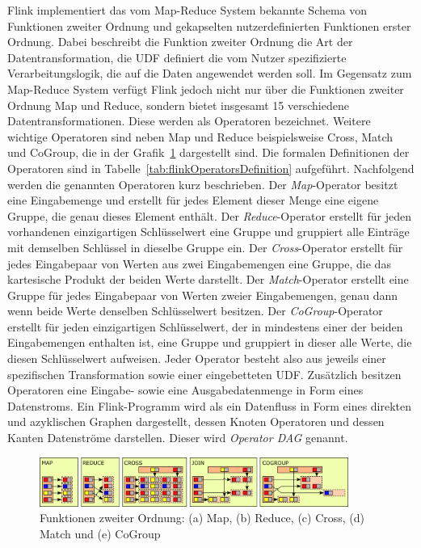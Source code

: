 Flink implementiert das vom Map-Reduce System bekannte Schema von Funktionen zweiter Ordnung und gekapselten nutzerdefinierten Funktionen erster Ordnung. Dabei beschreibt die Funktion zweiter Ordnung die Art der Datentransformation, die UDF definiert die vom Nutzer spezifizierte Verarbeitungslogik, die auf die Daten angewendet werden soll. Im Gegensatz zum Map-Reduce System verfügt Flink jedoch nicht nur über die Funktionen zweiter Ordnung Map und Reduce, sondern bietet insgesamt 15 verschiedene Datentransformationen. Diese werden als Operatoren bezeichnet. Weitere wichtige Operatoren sind neben Map und Reduce beispielsweise Cross, Match und CoGroup, die in der Grafik~\ref{graphicFlinkOperators} dargestellt sind. Die formalen Definitionen der Operatoren sind in Tabelle~\ref{tab:flinkOperatorsDefinition} aufgeführt. Nachfolgend werden die genannten Operatoren kurz beschrieben. Der \textit{Map}-Operator besitzt eine Eingabemenge und erstellt für jedes Element dieser Menge eine eigene Gruppe, die genau dieses Element enthält. Der \textit{Reduce}-Operator erstellt für jeden vorhandenen einzigartigen Schlüsselwert eine Gruppe und gruppiert alle Einträge mit demselben Schlüssel in dieselbe Gruppe ein. Der \textit{Cross}-Operator erstellt für jedes Eingabepaar von Werten aus zwei Eingabemengen eine Gruppe, die das kartesische Produkt der beiden Werte darstellt. Der \textit{Match}-Operator erstellt eine Gruppe für jedes Eingabepaar von Werten zweier Eingabemengen, genau dann wenn beide Werte denselben Schlüsselwert besitzen. Der \textit{CoGroup}-Operator erstellt für jeden einzigartigen Schlüsselwert, der in mindestens einer der beiden Eingabemengen enthalten ist, eine Gruppe und gruppiert in dieser alle Werte, die diesen Schlüsselwert aufweisen.
Jeder Operator besteht also aus jeweils einer spezifischen Transformation sowie einer eingebetteten UDF. Zusätzlich besitzen Operatoren eine Eingabe- sowie eine Ausgabedatenmenge in Form eines Datenstroms. Ein Flink-Programm wird als ein Datenfluss in Form eines direkten und azyklischen Graphen dargestellt, dessen Knoten Operatoren und dessen Kanten Datenströme darstellen. Dieser wird \textit{Operator DAG} genannt. 

\begin{figure}[h]
	\centering	
	\captionsetup{justification=centering,margin=2cm}
	\includegraphics[width=0.9\textwidth]{picture/flink_operators.png}
	\caption{Funktionen zweiter Ordnung: (a) Map, (b) Reduce, (c) Cross, (d) Match und (e) CoGroup \cite{Hueske2012}}
	\label{graphicFlinkOperators}
\end{figure}

